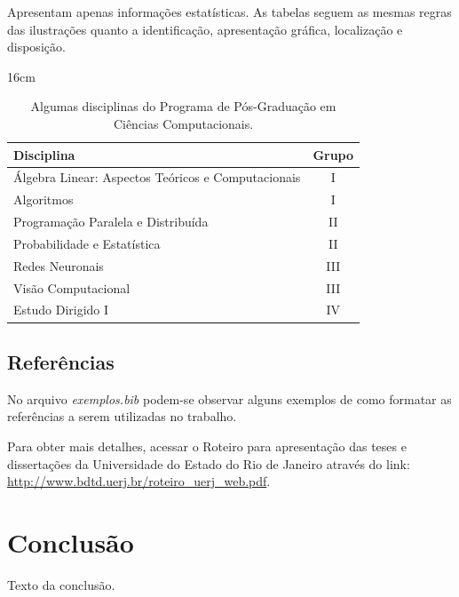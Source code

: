 \documentclass[a4paper,12pt,oneside,onecolumn,final,fleqn]{repUERJ}
\begin{document}
Apresentam apenas informações estatísticas. As tabelas seguem as mesmas regras das ilustrações quanto a identificação, apresentação gráfica, localização e disposição.

\begin{table}[htb]{16cm}
    \caption{\protect Algumas disciplinas do Programa de Pós-Graduação em Ciências Computacionais.}
    \label{tab:casos_sarampo}
    \hfill\begin{tabular}{l|c}
        Disciplina & Grupo \\
        \hline 
         Álgebra Linear: Aspectos Teóricos e Computacionais & I\\
         Algoritmos & I\\
         Programação Paralela e Distribuída & II\\
         Probabilidade e Estatística & II\\
         Redes Neuronais & III\\
         Visão Computacional & III\\
         Estudo Dirigido I & IV
    \end{tabular}\hfill
\end{table}


\section{Referências}

No arquivo \textit{exemplos.bib} podem-se observar alguns exemplos de como formatar as referências a serem utilizadas no trabalho. 

Para obter mais detalhes, acessar o Roteiro para apresentação das teses e dissertações da Universidade do Estado do Rio de Janeiro através do link: \url{http://www.bdtd.uerj.br/roteiro_uerj_web.pdf}.

\chapter*{Conclusão} %

Texto da conclusão.
\end{document}
